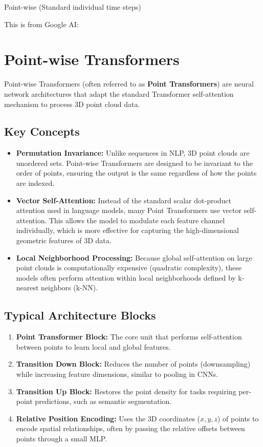 Point-wise (Standard individual time steps)


This is from Google AI:
\section*{Point-wise Transformers}
    
    Point-wise Transformers (often referred to as \textbf{Point Transformers}) are neural network architectures that adapt the standard Transformer self-attention mechanism to process 3D point cloud data.
    
    \subsection*{Key Concepts}
        \begin{itemize}
            \item \textbf{Permutation Invariance:} Unlike sequences in NLP, 3D point clouds are unordered sets. Point-wise Transformers are designed to be invariant to the order of points, ensuring the output is the same regardless of how the points are indexed.
            \item \textbf{Vector Self-Attention:} Instead of the standard scalar dot-product attention used in language models, many Point Transformers use vector self-attention. This allows the model to modulate each feature channel individually, which is more effective for capturing the high-dimensional geometric features of 3D data.
            \item \textbf{Local Neighborhood Processing:} Because global self-attention on large point clouds is computationally expensive (quadratic complexity), these models often perform attention within local neighborhoods defined by k-nearest neighbors (k-NN).
        \end{itemize}
    
    \subsection*{Typical Architecture Blocks}
        \begin{enumerate}
            \item \textbf{Point Transformer Block:} The core unit that performs self-attention between points to learn local and global features.
            \item \textbf{Transition Down Block:} Reduces the number of points (downsampling) while increasing feature dimensions, similar to pooling in CNNs.
            \item \textbf{Transition Up Block:} Restores the point density for tasks requiring per-point predictions, such as semantic segmentation.
            \item \textbf{Relative Position Encoding:} Uses the 3D coordinates ($x, y, z$) of points to encode spatial relationships, often by passing the relative offsets between points through a small MLP.
        \end{enumerate}
    
